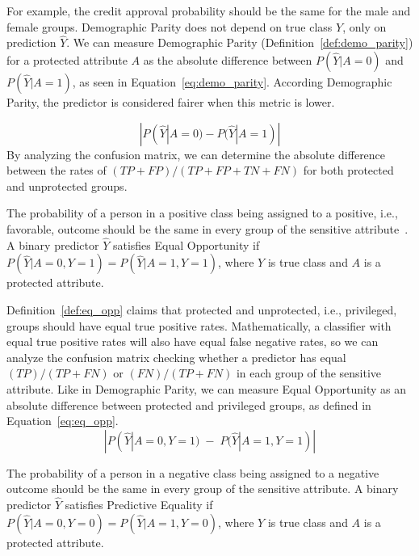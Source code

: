 For example, the credit approval probability should be the same for the male and female groups. Demographic Parity does not depend on true class $Y$, only on prediction $\hat{Y}$. We can measure Demographic Parity (Definition~\ref{def:demo_parity}) for a protected attribute $A$ as the absolute difference between $P(\hat{Y}|A=0)$ and $P(\hat{Y}|A=1)$, as seen in Equation~\ref{eq:demo_parity}. According Demographic Parity, the predictor is considered fairer when this metric is lower.

\begin{equation}\label{eq:demo_parity}
    |P(\hat{Y}|A=0)-P(\hat{Y}|A=1)|
\end{equation}
By analyzing the confusion matrix, we can determine the absolute difference between the rates of $(TP + FP)/(TP + FP + TN + FN)$ for both protected and unprotected groups.

\begin{definition}\label{def:eq_opp}
The probability of a person in a positive class being assigned to a positive, i.e., favorable, outcome should be the same in every group of the sensitive attribute~\citep{Hardt2016}. A binary predictor $\hat{Y}$ satisfies Equal Opportunity if $P(\hat{Y}|A=0,Y=1) = P(\hat{Y}|A=1,Y=1)$, where $Y$ is true class and $A$ is a protected attribute.
\end{definition}

Definition~\ref{def:eq_opp} claims that protected and unprotected, i.e., privileged, groups should have equal true positive rates. Mathematically, a classifier with equal true positive rates will also have equal false negative rates, so we can analyze the confusion matrix checking whether a predictor has equal $(TP)/(TP + FN)$ or $(FN)/(TP + FN)$ in each group of the sensitive attribute. Like in Demographic Parity, we can measure Equal Opportunity as an absolute difference between protected and privileged groups, as defined in Equation~\ref{eq:eq_opp}.
\begin{equation}\label{eq:eq_opp}
    |P(\hat{Y}|A=0,Y=1)\; - \; P(\hat{Y}|A=1,Y=1)|
\end{equation}

\begin{definition}\label{def:pred_eq}
The probability of a person in a negative class being assigned to a negative outcome should be the same in every group of the sensitive attribute. A binary predictor $\hat{Y}$ satisfies Predictive Equality if $P(\hat{Y}|A=0,Y=0) = P(\hat{Y}|A=1,Y=0)$, where $Y$ is true class and $A$ is a protected attribute.
\end{definition}

